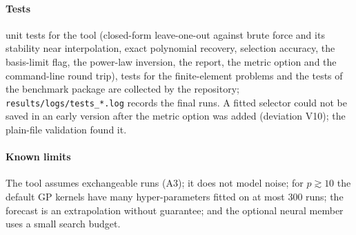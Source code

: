 \paragraph{Tests} \NToolTests{} unit tests for the tool (closed-form leave-one-out against brute force and its stability near interpolation, exact polynomial recovery, selection accuracy, the basis-limit flag, the power-law inversion, the report, the metric option and the command-line round trip), \NTpTests{} tests for the finite-element problems and the \NBenchTests{} tests of the benchmark package are collected by the repository; \texttt{results/logs/tests\_*.log} records the final runs. A fitted selector could not be saved in an early version after the metric option was added (deviation V10); the plain-file validation found it.
\paragraph{Known limits} The tool assumes exchangeable runs (A3); it does not model noise; for $p\gtrsim10$ the default GP kernels have many hyper-parameters fitted on at most 300 runs; the forecast is an extrapolation without guarantee; and the optional neural member uses a small search budget.
